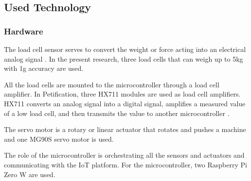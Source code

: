 \documentclass[conference]{IEEEtran}
\begin{document}
\subsection{Used Technology}
\subsubsection{Hardware}
The load cell sensor serves to convert the weight or force acting into an electrical analog signal \cite{b15}. In the present research, three load cells that can weigh up to 5kg with 1g accuracy are used.

All the load cells are mounted to the microcontroller through a load cell amplifier. In Petification, three HX711 modules are used as load cell amplifiers. HX711 converts an analog signal into a digital signal, amplifies a measured value of a low load cell, and then transmits the value to another microcontroller \cite{b16}. 

The servo motor is a rotary or linear actuator that rotates and pushes a machine \cite{b17} and one MG90S servo motor is used.

The role of the microcontroller is orchestrating all the sensors and actuators and communicating with the IoT platform. For the microcontroller, two Raspberry Pi Zero W are used.
\end{document}
